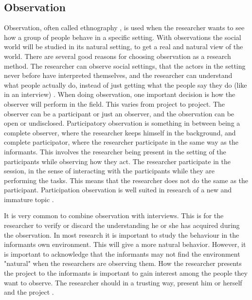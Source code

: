 \subsection{Observation}
Observation, often called ethnography \cite{tjora}, is used when the researcher wants to see how a group of people behave in a specific setting. With observations the social world will be studied in its natural setting, to get a real and natural view of the world. There are several good reasons for choosing observation as a research method. The researcher can observe social settings, that the actors in the setting never before have interpreted themselves, and the researcher can understand what people actually do, instead of just getting what the people say they do (like in an interview) \cite{tjora}. When doing observation, one important decision is how the observer will perform in the field. This varies from project to project. The observer can be a participant or just an observer, and the observation can be open or undisclosed. Participatory observation is something in between being a complete observer, where the researcher keeps himself in the background, and complete participator, where the researcher participate in the same way as the informants. This involves the researcher being present in the setting of the participants while observing how they act. The researcher participate in the session, in the sense of interacting with the participants while they are performing the tasks. This means that the researcher does not do the same as the participant. Participation observation is well suited in research of a new and immature topic \cite{qualitative}.

It is very common to combine observation with interviews. This is for the researcher to verify or discard the understanding he or she has acquired during the observation. In most research it is important to study the behaviour in the informants own environment. This will give a more natural behavior. However, it is important to acknowledge that the informants may not find the environment "natural" when the researchers are observing them. How the researcher presents the project to the informants is important to gain interest among the people they want to observe. The researcher should in a trusting way, present him or herself and the project \cite{qualitative}.

